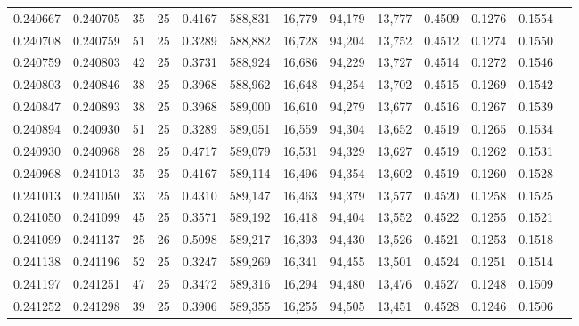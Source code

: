 \begin{tabular}{rrrrrrrrrrrrr}
0.240667 & 0.240705 &    35 &  25 &                                     0.4167 & 588,831 &  16,779 &  94,179 &  13,777 & 0.4509 & 0.1276 & 0.1554 \\
0.240708 & 0.240759 &    51 &  25 &                                     0.3289 & 588,882 &  16,728 &  94,204 &  13,752 & 0.4512 & 0.1274 & 0.1550 \\
0.240759 & 0.240803 &    42 &  25 &                                     0.3731 & 588,924 &  16,686 &  94,229 &  13,727 & 0.4514 & 0.1272 & 0.1546 \\
0.240803 & 0.240846 &    38 &  25 &                                     0.3968 & 588,962 &  16,648 &  94,254 &  13,702 & 0.4515 & 0.1269 & 0.1542 \\
0.240847 & 0.240893 &    38 &  25 &                                     0.3968 & 589,000 &  16,610 &  94,279 &  13,677 & 0.4516 & 0.1267 & 0.1539 \\
0.240894 & 0.240930 &    51 &  25 &                                     0.3289 & 589,051 &  16,559 &  94,304 &  13,652 & 0.4519 & 0.1265 & 0.1534 \\
0.240930 & 0.240968 &    28 &  25 &                                     0.4717 & 589,079 &  16,531 &  94,329 &  13,627 & 0.4519 & 0.1262 & 0.1531 \\
0.240968 & 0.241013 &    35 &  25 &                                     0.4167 & 589,114 &  16,496 &  94,354 &  13,602 & 0.4519 & 0.1260 & 0.1528 \\
0.241013 & 0.241050 &    33 &  25 &                                     0.4310 & 589,147 &  16,463 &  94,379 &  13,577 & 0.4520 & 0.1258 & 0.1525 \\
0.241050 & 0.241099 &    45 &  25 &                                     0.3571 & 589,192 &  16,418 &  94,404 &  13,552 & 0.4522 & 0.1255 & 0.1521 \\
0.241099 & 0.241137 &    25 &  26 &                                     0.5098 & 589,217 &  16,393 &  94,430 &  13,526 & 0.4521 & 0.1253 & 0.1518 \\
0.241138 & 0.241196 &    52 &  25 &                                     0.3247 & 589,269 &  16,341 &  94,455 &  13,501 & 0.4524 & 0.1251 & 0.1514 \\
0.241197 & 0.241251 &    47 &  25 &                                     0.3472 & 589,316 &  16,294 &  94,480 &  13,476 & 0.4527 & 0.1248 & 0.1509 \\
0.241252 & 0.241298 &    39 &  25 &                                     0.3906 & 589,355 &  16,255 &  94,505 &  13,451 & 0.4528 & 0.1246 & 0.1506 \\

\end{tabular}
